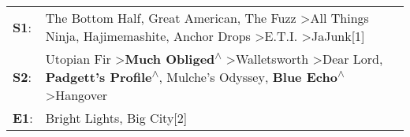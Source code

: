 \begin{supertabular}{p{0.03\textwidth}p{0.92\textwidth}}
 \textbf{S1}:  &                                                                  The Bottom Half\textsuperscript{}, \enspace Great American\textsuperscript{}, \enspace The Fuzz\textsuperscript{} \textgreater \enspace All Things Ninja\textsuperscript{}, \enspace Hajimemashite\textsuperscript{}, \enspace Anchor Drops\textsuperscript{} \textgreater \enspace E.T.I.\textsuperscript{} \textgreater \enspace JaJunk[1]\textsuperscript{}  \enspace  \\
 \textbf{S2}:  &  Utopian Fir\textsuperscript{} \textgreater \enspace \textbf{Much Obliged\textsuperscript{$\wedge$}} \textgreater \enspace Walletsworth\textsuperscript{} \textgreater \enspace Dear Lord\textsuperscript{}, \enspace \textbf{Padgett's Profile\textsuperscript{$\wedge$}}, \enspace Mulche's Odyssey\textsuperscript{}, \enspace \textbf{Blue Echo\textsuperscript{$\wedge$}} \textgreater \enspace Hangover\textsuperscript{}  \enspace  \\
 \textbf{E1}:  &                                                                                                                                                                                                                                                                                                                                                                                    Bright Lights, Big City[2]\textsuperscript{}  \enspace  \\
\end{supertabular}

